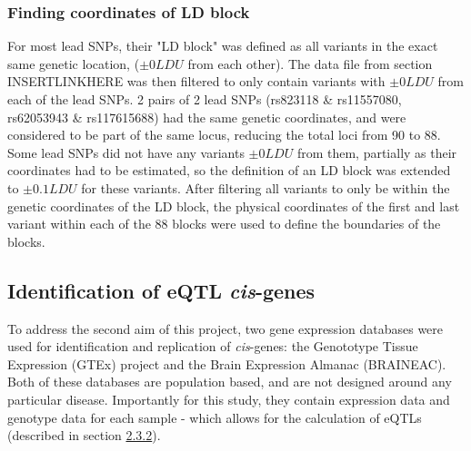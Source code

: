 \documentclass{article}
\begin{document}
\subsubsection{Finding coordinates of LD block}
\label{subsubsec:LDblock}
For most lead SNPs, their "LD block" was defined as all variants in the exact same genetic location, ($\pm0LDU$ from each other). The data file from section INSERTLINKHERE was then filtered to only contain variants with $\pm0LDU$ from each of the lead SNPs. 2 pairs of 2 lead SNPs (rs823118 \& rs11557080, rs62053943 
\& rs117615688) had the same genetic coordinates, and were considered to be part of the same locus, reducing the total loci from 90 to 88. Some lead SNPs did not have any variants $\pm0LDU$ from them, partially as their coordinates had to be estimated, so the definition of an LD block was extended to $\pm0.1LDU$ for these variants. After filtering all variants to only be within the genetic coordinates of the LD block, the physical coordinates of the first and last variant within each of the 88 blocks were used to define the boundaries of the blocks. 

\subsection{Identification of eQTL \textit{cis}-genes}
To address the second aim of this project, two gene expression databases were used for identification and replication of \textit{cis}-genes: the Genototype Tissue Expression (GTEx) project\cite{Lonsdale2013TheProject} and the Brain Expression Almanac (BRAINEAC)\cite{Ramasamy2014GeneticBrain}. Both of these databases are population based, and are not designed around any particular disease. Importantly for this study, they contain expression data and genotype data for each sample - which allows for the calculation of eQTLs (described in section \hyperref[subsubsec:QTL]{2.3.2}).
\end{document}
